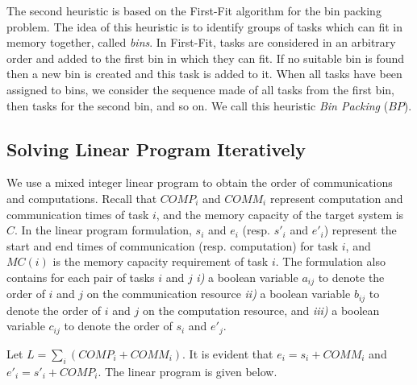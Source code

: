 \documentclass[sigconf]{acmart}
\begin{document}
The second heuristic is based on the First-Fit algorithm for the bin packing problem. The idea of this heuristic is to identify groups of tasks which can fit in memory together, called \emph{bins}. In First-Fit, tasks are considered in an arbitrary order and added to the first bin in which they can fit. If no suitable bin is found then a new bin is created and this task is added to it. When all tasks have been assigned to bins, we consider the sequence made of all tasks from the first bin, then tasks for the second bin, and so on. We call this heuristic \textit{Bin Packing} ($BP$). 

	

	
	
	\subsection{Solving Linear Program Iteratively}
	\label{subsec:linearprogrammingformulation}
	We use a mixed integer linear program to obtain the order of communications and computations. Recall that $COMP_i$ and $COMM_i$ represent computation and communication times of task $i$, and the memory capacity of the target system is $C$. In the linear program formulation, $s_i$ and $e_i$ (resp. $s'_i$ and $e'_i$) represent the start and end times of communication (resp. computation) for task $i$, and $MC(i)$ is the memory capacity requirement of task $i$. The formulation also contains for each pair of tasks $i$ and $j$ \textit{i)} a boolean variable $a_{ij}$ to denote the order of $i$ and $j$ on the communication resource \textit{ii)} a boolean variable $b_{ij}$ to denote the order of $i$ and $j$ on the computation resource, and \textit{iii)} a boolean variable $c_{ij}$ to denote the order of $s_i$ and $e'_j$. 
	
	
	
	
	
	
	\noindent Let $L=\sum_i (COMP_i + COMM_i)$. It is evident that $e_i =s_i + COMM_i$ and $e'_i =s'_i + COMP_i$. The linear program is given below.
	
\end{document}
